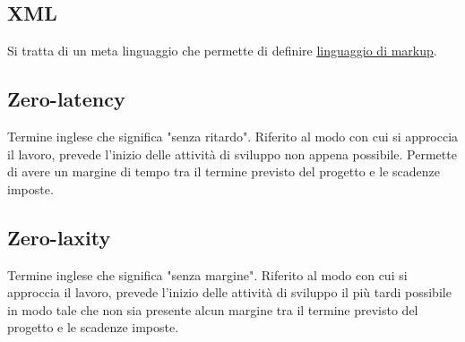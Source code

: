 	\subsection{XML}
	\label{sec:xml}
	Si tratta di un meta linguaggio che permette di definire \underline{\hyperref[sec:linguaggiomarkup]{linguaggio di markup}}.
	
	
	\newpage

	
	\subsection{Zero-latency}
	\label{sec:zerolatency}
	Termine inglese che significa "senza ritardo". Riferito al modo con cui si approccia il lavoro, prevede l'inizio delle attività di sviluppo non appena possibile. Permette di avere un margine di tempo tra il termine previsto del progetto e le scadenze imposte.

	
	\subsection{Zero-laxity}
	\label{sec:zerolaxity}
	Termine inglese che significa "senza margine". Riferito al modo con cui si approccia il lavoro, prevede l'inizio delle attività di sviluppo il più tardi possibile in modo tale che non sia presente alcun margine tra il termine previsto del progetto e le scadenze imposte.


